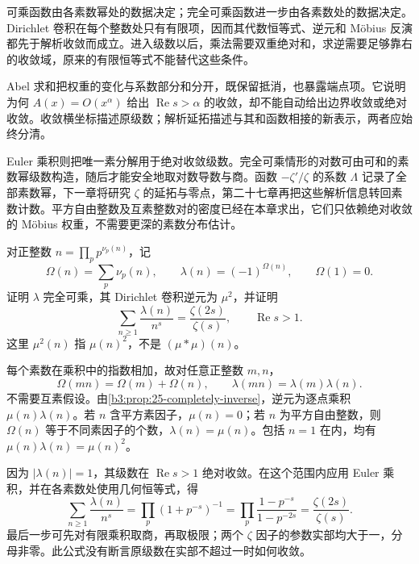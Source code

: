 





\begin{chaptersummary}
可乘函数由各素数幂处的数据决定；完全可乘函数进一步由各素数处的数据决定。Dirichlet 卷积在每个整数处只有有限项，因而其代数恒等式、逆元和 Möbius 反演都先于解析收敛而成立。进入级数以后，乘法需要双重绝对和，求逆需要足够靠右的收敛域，原来的有限恒等式不能替代这些条件。

Abel 求和把权重的变化与系数部分和分开，既保留抵消，也暴露端点项。它说明为何 \(A(x)=O(x^\alpha)\) 给出 \(\operatorname{Re}s>\alpha\) 的收敛，却不能自动给出边界收敛或绝对收敛。收敛横坐标描述原级数；解析延拓描述与其和函数相接的新表示，两者应始终分清。

Euler 乘积则把唯一素分解用于绝对收敛级数。完全可乘情形的对数可由可和的素数幂级数构造，随后才能安全地取对数导数与商。函数 \(-\zeta'/\zeta\) 的系数 \(\Lambda\) 记录了全部素数幂，下一章将研究 \(\zeta\) 的延拓与零点，第二十七章再把这些解析信息转回素数计数。平方自由整数及互素整数对的密度已经在本章求出，它们只依赖绝对收敛的 Möbius 权重，不需要更深的素数分布估计。
\end{chaptersummary}

\BookExercises


\begin{exercise}\label{b3:ex:25-1}
对正整数 \(n=\prod_p p^{\nu_p(n)}\)，记
\[
 \Omega(n)=\sum_p\nu_p(n),\qquad \lambda(n)=(-1)^{\Omega(n)},
 \qquad \Omega(1)=0.
\]
证明 \(\lambda\) 完全可乘，其 Dirichlet 卷积逆元为 \(\mu^2\)，并证明
\[
 \sum_{n\ge1}\frac{\lambda(n)}{n^s}
 =\frac{\zeta(2s)}{\zeta(s)},\qquad \operatorname{Re}s>1.
\]
这里 \(\mu^2(n)\) 指 \(\mu(n)^2\)，不是 \((\mu*\mu)(n)\)。
\end{exercise}
\begin{solution}
每个素数在乘积中的指数相加，故对任意正整数 \(m,n\)，
\[
 \Omega(mn)=\Omega(m)+\Omega(n),\qquad
 \lambda(mn)=\lambda(m)\lambda(n).
\]
不需要互素假设。由\cref{b3:prop:25-completely-inverse}，逆元为逐点乘积 \(\mu(n)\lambda(n)\)。若 \(n\) 含平方素因子，\(\mu(n)=0\)；若 \(n\) 为平方自由整数，则 \(\Omega(n)\) 等于不同素因子的个数，\(\lambda(n)=\mu(n)\)。包括 \(n=1\) 在内，均有 \(\mu(n)\lambda(n)=\mu(n)^2\)。

因为 \(|\lambda(n)|=1\)，其级数在 \(\operatorname{Re}s>1\) 绝对收敛。在这个范围内应用 Euler 乘积，并在各素数处使用几何恒等式，得
\[
 \sum_{n\ge1}\frac{\lambda(n)}{n^s}
 =\prod_p(1+p^{-s})^{-1}
 =\prod_p\frac{1-p^{-s}}{1-p^{-2s}}
 =\frac{\zeta(2s)}{\zeta(s)}.
\]
最后一步可先对有限乘积取商，再取极限；两个 \(\zeta\) 因子的参数实部均大于一，分母非零。此公式没有断言原级数在实部不超过一时如何收敛。
\end{solution}

